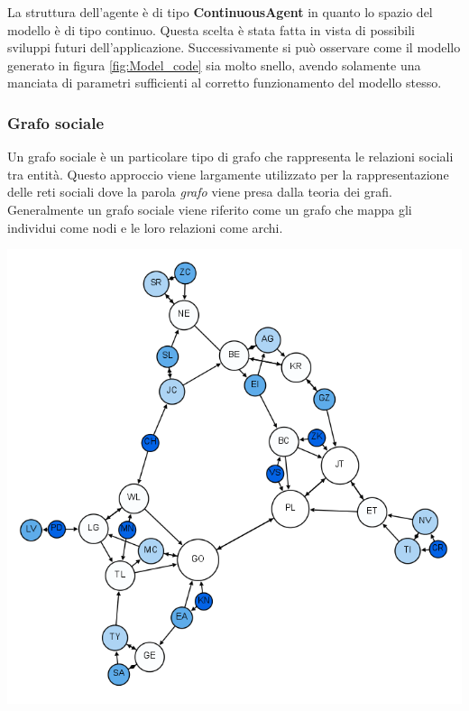 La struttura dell'agente è di tipo \textbf{ContinuousAgent} in quanto lo 
spazio del modello è di tipo continuo. Questa scelta è stata fatta in vista di possibili 
sviluppi futuri dell'applicazione. Successivamente si può osservare come il modello generato 
in figura \ref{fig:Model_code} sia molto snello, avendo solamente una manciata di parametri 
sufficienti al corretto funzionamento del modello stesso. 

\subsubsection*{Grafo sociale}
Un grafo sociale è un particolare tipo di grafo che rappresenta le relazioni sociali tra entità.
Questo approccio viene largamente utilizzato per la rappresentazione delle reti sociali dove la 
parola \emph{grafo} viene presa dalla teoria dei grafi. Generalmente un grafo sociale viene riferito come un
grafo che mappa gli individui come nodi e le loro relazioni come archi. 

\begin{minipage}{\linewidth}
    \centering
    \includegraphics[width=\textwidth]{img/Moreno_Sociogram_3rd_Grade.png}
    \label{fig:social_graph}
\end{minipage}

